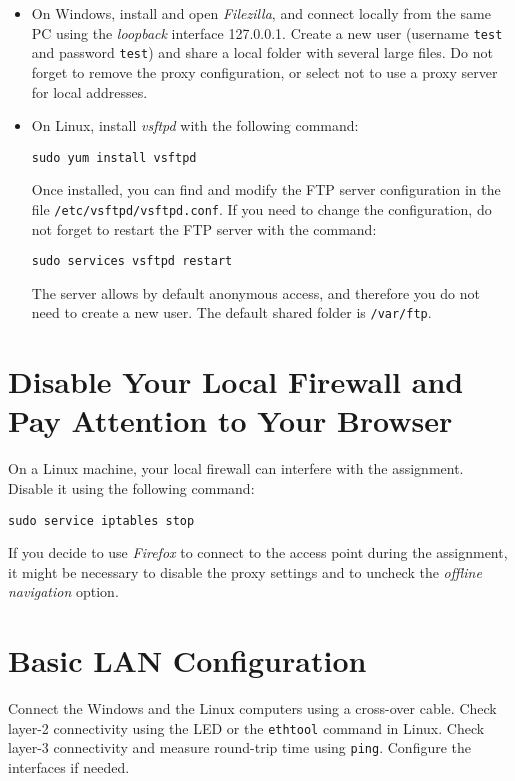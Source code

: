 \begin{itemize}

\item On Windows, install and open \emph{Filezilla}, and connect locally from the same PC using the \emph{loopback} interface 127.0.0.1. Create a new user (username \texttt{\color{blue}test} and password \texttt{\color{blue}test}) and share a local folder with several large files. Do not forget to remove the proxy configuration, or select not to use a proxy server for local addresses.

\item On Linux, install \emph{vsftpd} with the following command:
\begin{lstlisting}
sudo yum install vsftpd
\end{lstlisting}
    Once installed, you can find and modify the FTP server configuration in the file \texttt{/etc/vsftpd/vsftpd.conf}. If you need to change the configuration, do not forget to restart the FTP server with the command:
\begin{lstlisting}
sudo services vsftpd restart
\end{lstlisting}
    The server allows by default anonymous access, and therefore you do not need to create a new user. The default shared folder is \texttt{/var/ftp}.
\end{itemize}

\section{Disable Your Local Firewall and Pay Attention to Your Browser}

On a Linux machine, your local firewall can interfere with the assignment. Disable it using the following command:

\begin{lstlisting}
sudo service iptables stop
\end{lstlisting}

If you decide to use \emph{Firefox} to connect to the access point during the assignment, it might be necessary to disable the proxy settings and to uncheck the \emph{offline navigation} option.

\section{Basic LAN Configuration}

Connect the Windows and the Linux computers using a cross-over cable. Check layer-2 connectivity using the LED or the \texttt{\color{blue}ethtool} command in Linux. Check layer-3 connectivity and measure round-trip time using \texttt{\color{blue}ping}. Configure the interfaces if needed.

